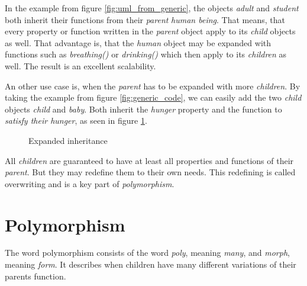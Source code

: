 In the example from figure  \ref{fig:uml_from_generic}, the objects \emph{adult} and \emph{student} both inherit their functions from their \emph{parent} \emph{human being}. That means, that every property or function written in the \emph{parent} object apply to its \emph{child} objects as well. That advantage is, that the \emph{human} object may be expanded with functions such as \emph{breathing()} or \emph{drinking()} which then apply to its \emph{children} as well. The result is an excellent scalability. 

An other use case is, when the \emph{parent} has to be expanded with more \emph{children}. By taking the example from figure \ref{fig:generic_code}, we can easily add the two \emph{child} objects \emph{child} and \emph{baby}. Both inherit the \emph{hunger} property and the function to \emph{satisfy their hunger}, as seen in figure \ref{fig:uml_inheritance}.
\begin{figure}[!h]
\begin{center}
\end{center}
\caption{Expanded inheritance}
\label{fig:uml_inheritance}
\end{figure}

All \emph{children} are guaranteed to have at least all properties and functions of their \emph{parent}. But they may redefine them to their own needs. This redefining is called overwriting and is a key part of \emph{polymorphism}.

\section{Polymorphism}

The word polymorphism consists of the word \emph{poly}, meaning \emph{many}, and \emph{morph}, meaning \emph{form}. It describes when children have many different variations of their parents function. 

